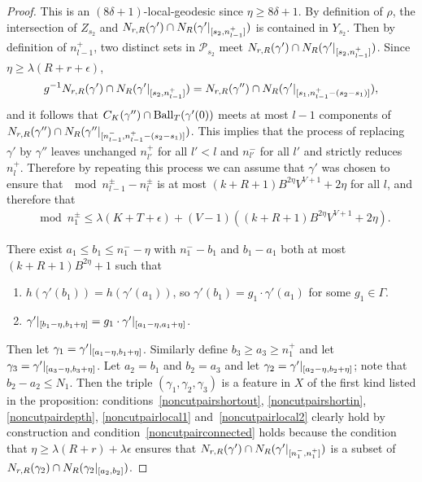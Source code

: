 \begin{proof}
This is an $(8\delta+1)$-local-geodesic since $\eta \geq 8\delta+1$. By
definition of $\rho$, the intersection of $Z_{s_2}$ and $N_{r, R}(\gamma')
\cap N_R(\gamma'\vert_{[s_2, n_{l-1}^+]})$ is contained in
$Y_{s_2}$. Then by definition of $n_{l-1}^+$, two distinct sets in
$\mathcal{P}_{s_2}$ meet $N_{r, R}(\gamma') \cap
N_R(\gamma'\vert_{[s_2, n_{l-1}^+]})$. Since $\eta \geq \lambda(R + r +
\epsilon)$,
\begin{align*}
  g^{-1}N_{r, R}(\gamma') \cap N_R(\gamma'\vert_{[s_2, n_{l-1}^+]})
  = N_{r, R}(\gamma'') \cap N_R(\gamma'\vert_{[s_1, n_{l-1}^+ -
  (s_2 - s_1)]}),
\end{align*}
and it follows that $C_K(\gamma'') \cap \operatorname{\mathrm{Ball}}_T(\gamma'(0))$ meets at
most $l-1$ components of $N_{r, R}(\gamma'') \cap
N_R(\gamma''\vert_{[n_{l-1}^-, n_{l-1}^+ - (s_2 - s_1)]})$. This implies
that the process of replacing $\gamma'$ by $\gamma''$ leaves unchanged
$n_{l'}^+$ for all $l' < l$ and $n_{l'}^-$ for all $l'$ and strictly reduces
$n_l^+$.  Therefore by repeating this process we can assume that $\gamma'$ was
chosen to ensure that $\mod{n_{l-1}^\pm - n_l^\pm}$ is at most
$(k+R+1)B^{2\eta}V^{V+1} + 2\eta$ for all $l$, and therefore that 
\begin{align*}
  \mod{n_1^\pm} \leq \lambda(K + T + \epsilon) + (V-1)((k+R+1)B^{2\eta}V^{V+1} + 2\eta).
\end{align*}

There exist $a_1 \leq b_1 \leq n_1^- - \eta$ with $n_1^- - b_1$ and $b_1 - a_1$
both at most $(k+R+1)B^{2\eta} + 1$ such that 
\begin{enumerate}
\item $h(\gamma'(b_1)) = h(\gamma'(a_1))$, so $\gamma'(b_1) = g_1\cdot
  \gamma'(a_1)$ for some $g_1 \in \Gamma$.
\item $\gamma'\vert_{[b_1 - \eta, b_1 + \eta]} =
  g_1\cdot\gamma'\vert_{[a_1 - \eta, a_1 + \eta]}$.
\end{enumerate}
Then let $\gamma_1 = \gamma'\vert_{[a_1 - \eta, b_1+\eta]}$. Similarly
define $b_3 \geq a_3 \geq n_1^+$ and let $\gamma_3 = \gamma'\vert_{[a_3 -
\eta, b_3 + \eta]}$. Let $a_2 = b_1$ and $b_2 = a_3$ and let $\gamma_2 =
\gamma'\vert_{[a_2 - \eta, b_2 + \eta]}$; note that $b_2 - a_2 \leq N_1$.
Then the triple $(\gamma_1, \gamma_2, \gamma_3)$ is a feature in $X$ of the
first kind listed in the proposition: conditions~\ref{noncutpairshortout},
\ref{noncutpairshortin}, \ref{noncutpairdepth}, \ref{noncutpairlocal1}
and~\ref{noncutpairlocal2} clearly hold by construction and
condition~\ref{noncutpairconnected} holds because the condition that $\eta \geq
\lambda(R + r) + \lambda\epsilon$ ensures that $N_{r, R}(\gamma') \cap
N_R(\gamma'\vert_{[n_1^-, n_1^+]})$ is a subset of $N_{r, R}(\gamma_2)
\cap N_R(\gamma_2\vert_{[a_2, b_2]})$.


\end{proof}
